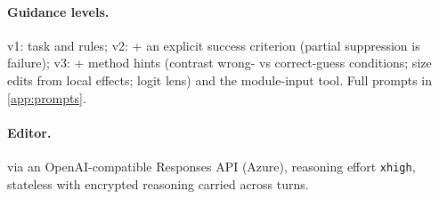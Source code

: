 \paragraph{Guidance levels.} v1: task and rules; v2: + an explicit success criterion (partial suppression is failure);
v3: + method hints (contrast wrong- vs correct-guess conditions; size edits from local effects; logit lens) and the
module-input tool. Full prompts in \cref{app:prompts}.

\paragraph{Editor.} \astra{} via an OpenAI-compatible Responses API (Azure), reasoning effort \texttt{xhigh},
stateless with encrypted reasoning carried across turns.
